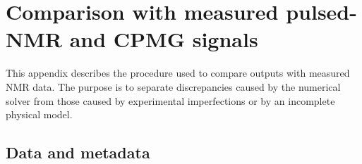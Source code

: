 \begin{table}[htb]
\small
\caption{Expanded summary of the numerical calibration tests.  The relative
$\chi^2_{\mathrm{rel}}$ is defined in Eq.~\eqref{eq:calibration_chisq_revision}.
The entries marked ``TBD'' should be replaced by values generated using the
same parameter sets as the revised figures.}
\label{tab:calibration_summary_revision}
\end{table}


\appendix
\section{Comparison with measured pulsed-NMR and CPMG signals}
\label{app:experimental_comparison_revision}

This appendix describes the procedure used to compare \axionbloch{} outputs
with measured NMR data.  The purpose is to separate discrepancies caused by
the numerical solver from those caused by experimental imperfections or by
an incomplete physical model.

\subsection{Data and metadata}

